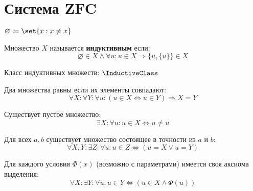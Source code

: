\documentclass{article}
\begin{document}
\section{Система ZFC}
    \begin{defnotation}
        \(\varnothing \coloneq \set{x : x \ne x}\)
    \end{defnotation}
    \begin{definition}
        \label{def:inductive-class}
        Множество \(X\) называется \textbf{индуктивным} если:
        \[\varnothing \in X \land \forall u: u \in X \Rightarrow \{u, \{u\}\} \in X\]
        
        Класс индуктивных множеств: \(\InductiveClass\)
    \end{definition}

    \begin{axiom}
        Два множества равны если их элементы совпадают:
        \begin{equation}
            \label{ZFC-Ext}
            \forall X: \forall Y: \forall u: \left(u \in X \Leftrightarrow u \in Y \right) \Rightarrow X = Y \tag{Ext}
        \end{equation}
    \end{axiom}
    \begin{axiom}
        Существует пустое множество:
        \begin{equation}
            \label{ZFC-Empty}
            \exists X: \forall u: u \in X \Leftrightarrow u \ne u \tag{Empty}
        \end{equation}
    \end{axiom}
    \begin{axiom}
        Для всех \(a, b\) существует множество состоящее в точности из \(a\) и \(b\):
        \begin{equation}
            \label{ZFC-Pair}
            \forall X,Y: \exists Z: \forall u: u \in Z \Leftrightarrow (u = X \lor  u = Y) \tag{Pair}
        \end{equation}
    \end{axiom}
    \begin{axiom}
        Для каждого условия \(\Phi(x)\) (возможно с параметрами) имеется своя аксиома выделения:
        \begin{equation}
            \label{ZFC-Sep}
            \forall X: \exists Y: \forall u: u \in Y \Leftrightarrow (u \in X \land \Phi(u)) \tag{Sep}
        \end{equation}
    \end{axiom}
\end{document}
